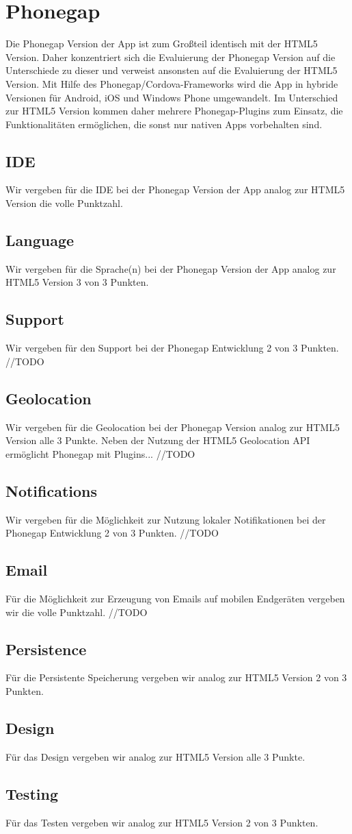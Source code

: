 \section{Phonegap}
Die Phonegap Version der App ist zum Großteil identisch mit der HTML5 Version. Daher konzentriert sich die Evaluierung der Phonegap Version auf die Unterschiede zu dieser und verweist ansonsten auf die Evaluierung der HTML5 Version. Mit Hilfe des Phonegap/Cordova-Frameworks wird die App in hybride Versionen für Android, iOS und Windows Phone umgewandelt. Im Unterschied zur HTML5 Version kommen daher mehrere Phonegap-Plugins zum Einsatz, die Funktionalitäten ermöglichen, die sonst nur nativen Apps vorbehalten sind.

\subsection{IDE}
Wir vergeben für die IDE bei der Phonegap Version der App analog zur HTML5 Version die volle Punktzahl.

\subsection{Language}
Wir vergeben für die Sprache(n) bei der Phonegap Version der App analog zur HTML5 Version 3 von 3 Punkten.

\subsection{Support}
Wir vergeben für den Support bei der Phonegap Entwicklung 2 von 3 Punkten. //TODO

\subsection{Geolocation}
Wir vergeben für die Geolocation bei der Phonegap Version analog zur HTML5 Version alle 3 Punkte. Neben der Nutzung der HTML5 Geolocation API ermöglicht Phonegap mit Plugins... //TODO

\subsection{Notifications}
Wir vergeben für die Möglichkeit zur Nutzung lokaler Notifikationen bei der Phonegap Entwicklung 2 von 3 Punkten. //TODO

\subsection{Email}
Für die Möglichkeit zur Erzeugung von Emails auf mobilen Endgeräten vergeben wir die volle Punktzahl. //TODO

\subsection{Persistence}
Für die Persistente Speicherung vergeben wir analog zur HTML5 Version 2 von 3 Punkten.

\subsection{Design}
Für das Design vergeben wir analog zur HTML5 Version alle 3 Punkte.

\subsection{Testing}
Für das Testen vergeben wir analog zur HTML5 Version 2 von 3 Punkten.
